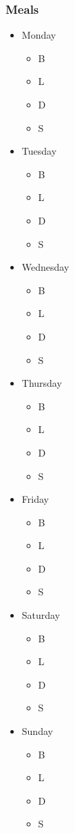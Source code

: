 \documentclass[a4paper]{article}
\begin{document}
\begin{itemize}
\subsubsection{Meals}
\begin{itemize}
  \item Monday
		\begin{itemize}
     \item B
     \item L
     \item D
     \item S
     \end{itemize}
  \item Tuesday
		\begin{itemize}
     \item B
     \item L
     \item D
     \item S
     \end{itemize}
  \item Wednesday
		\begin{itemize}
     \item B
     \item L
     \item D
     \item S
     \end{itemize}
	\item Thursday
		\begin{itemize}
     \item B
     \item L
     \item D
     \item S
     \end{itemize}
	\item Friday
		\begin{itemize}
     \item B
     \item L
     \item D
     \item S
     \end{itemize}
	\item Saturday
		\begin{itemize}
     \item B
     \item L
     \item D
     \item S
     \end{itemize}
	\item	Sunday
		\begin{itemize}
     \item B
     \item L
     \item D
     \item S
     \end{itemize}
\end{itemize}
\newpage

\end{itemize}
\end{document}
